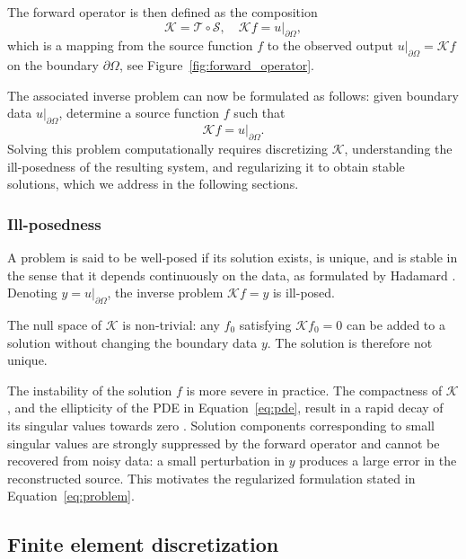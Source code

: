 The forward operator is then defined as the composition
\begin{equation}\label{eq:K}
    \mathcal K = \mathcal T \circ \mathcal S, \quad \mathcal{K} f = u|_{\partial\Omega},
\end{equation}
which is a mapping from the source function $f$ to the observed output $u|_{\partial\Omega} = \mathcal K f$ on the boundary $\partial \Omega$, see Figure~\ref{fig:forward_operator}.

The associated inverse problem can now be formulated as follows: given boundary data $u|_{\partial\Omega}$, determine a source function $f$ such that
\begin{equation*}
    \mathcal{K} f = u|_{\partial\Omega}.
\end{equation*}
Solving this problem computationally requires discretizing $\mathcal{K}$, understanding the ill-posedness of the resulting system, and regularizing it to obtain stable solutions, which we address in the following sections.


\subsubsection{Ill-posedness}\label{sec:ill_posedness}
A problem is said to be well-posed if its solution exists, is unique, and is stable in the sense that it depends continuously on the data, as formulated by Hadamard \cite{hansen2010discrete}. Denoting $y = u|_{\partial\Omega}$, the inverse problem $\mathcal{K}f = y$ is ill-posed.

The null space of $\mathcal{K}$ is non-trivial: any $f_0$ satisfying $\mathcal{K}f_0 = 0$ can be added to a solution without changing the boundary data $y$. The solution is therefore not unique.

The instability of the solution $f$ is more severe in practice. The compactness of $\mathcal{K}$, and the ellipticity of the PDE in Equation~\eqref{eq:pde}, result in a rapid decay of its singular values towards zero \cite{evansPartialDifferentialEquations2010,engl1996regularization}. Solution components corresponding to small singular values are strongly suppressed by the forward operator and cannot be recovered from noisy data: a small perturbation in $y$ produces a large error in the reconstructed source. This motivates the regularized formulation stated in Equation~\eqref{eq:problem}.


\subsection{Finite element discretization}
